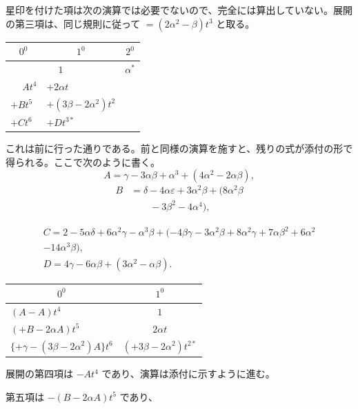\documentclass[11pt]{article}
\begin{document}
星印を付けた項は次の演算では必要でないので、完全には算出していない。展開の第三項は、同じ規則に従って $=(2\alpha^2-\beta)t^3$ と取る。

\noindent
\begin{minipage}[t]{0.47\linewidth}\vspace{0pt}
\begin{tabular}{|l|l|l|}
\hline
\multicolumn{1}{|c|}{$0^0$} & \multicolumn{1}{c|}{$1^0$} & \multicolumn{1}{c|}{$2^0$}\\
\hline
 & $\phantom{+}1$ & $\alpha^*$\\
$\phantom{+}At^4$ & $+2\alpha t$ & \\
$+Bt^5$ & $+(3\beta-2\alpha^2)t^2$ & \\
$+Ct^6$ & $+Dt^{3*}$ & \\
\hline
\end{tabular}
\end{minipage}\hfill
\begin{minipage}[t]{0.5\linewidth}\vspace{0pt}
これは前に行った通りである。前と同様の演算を施すと、残りの式が添付の形で得られる。ここで次のように書く。
\[
A=\gamma-3\alpha\beta+\alpha^3+(4\alpha^2-2\alpha\beta),
\]
\[
\begin{aligned}
B&=\delta-4\alpha\varepsilon+3\alpha^2\beta+(8\alpha^2\beta\\
&\qquad-3\beta^2-4\alpha^4),
\end{aligned}
\]
\end{minipage}
\[
\begin{gathered}
C=2-5\alpha\delta+6\alpha^2\gamma-\alpha^3\beta+(-4\beta\gamma-3\alpha^2\beta+8\alpha^2\gamma+7\alpha\beta^2+6\alpha^2\\
-14\alpha^3\beta),\\
D=4\gamma-6\alpha\beta+(3\alpha^2-\alpha\beta).
\end{gathered}
\]

\noindent
\begin{minipage}[t]{0.62\linewidth}\vspace{0pt}
\begin{tabular}{|l|c|}
\hline
\multicolumn{1}{|c|}{$0^0$} & $1^0$\\
\hline
$(A-A)t^4$ & $1$\\
$(+B-2\alpha A)t^5$ & $2\alpha t$\\
$\{+\gamma-(3\beta-2\alpha^2)A\}t^6$ & $(+3\beta-2\alpha^2)t^{2*}$\\
\hline
\end{tabular}
\end{minipage}\hfill
\begin{minipage}[t]{0.35\linewidth}\vspace{0pt}
\setlength{\parindent}{1.5em}
\indent 展開の第四項は $-At^4$ であり、演算は添付に示すように進む。

第五項は $-(B-2\alpha A)t^5$ であり、
\end{minipage}
\end{document}

